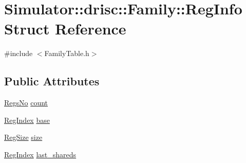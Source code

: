 \hypertarget{struct_simulator_1_1drisc_1_1_family_1_1_reg_info}{\section{Simulator\+:\+:drisc\+:\+:Family\+:\+:Reg\+Info Struct Reference}
\label{struct_simulator_1_1drisc_1_1_family_1_1_reg_info}
}


{\ttfamily \#include $<$Family\+Table.\+h$>$}

\subsection*{Public Attributes}
\begin{DoxyCompactItemize}
\item 
\hyperlink{struct_simulator_1_1_regs_no}{Regs\+No} \hyperlink{struct_simulator_1_1drisc_1_1_family_1_1_reg_info_acc2ad70f3b688fa40795ba2289115970}{count}
\item 
\hyperlink{namespace_simulator_ab00c9033de4c9a17db7b53d6c292515c}{Reg\+Index} \hyperlink{struct_simulator_1_1drisc_1_1_family_1_1_reg_info_af6db1a141f61cce61b2f2dd993d227de}{base}
\item 
\hyperlink{namespace_simulator_a7c5ca3b196c951c92b8159e54e76075f}{Reg\+Size} \hyperlink{struct_simulator_1_1drisc_1_1_family_1_1_reg_info_a8edcf21621164c20c10cdc1babc1112e}{size}
\item 
\hyperlink{namespace_simulator_ab00c9033de4c9a17db7b53d6c292515c}{Reg\+Index} \hyperlink{struct_simulator_1_1drisc_1_1_family_1_1_reg_info_ae04720534956ec61ba4fad57b8e274ea}{last\+\_\+shareds}
\end{DoxyCompactItemize}


